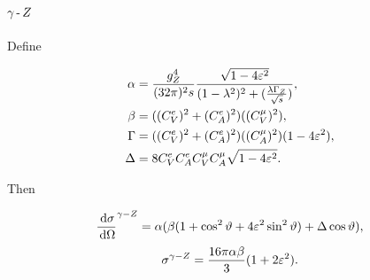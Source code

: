 \documentclass[]{article}
\begin{document}
\subsection{$\gamma\operatorname{-}Z $}

Define

\begin{align*}
\alpha &= \frac{g_{\Zzero}^{4}}{(32\pi)^{2}s} \frac{\sqrt{1-4\varepsilon^{2}}}{(1-\lambda^{2})^{2} + (\frac{\lambda\GZ}{\rts})},
\\
\beta &= ((C_{V}^{e})^{2} + (C_{A}^{e})^{2})((C_{V}^{\mu})^{2}),
\\
\Gamma &= ((C_{V}^{e})^{2} + (C_{A}^{e})^{2})((C_{A}^{\mu})^{2})(1-4\varepsilon^{2}),
\\
\Delta &= 8C_{V}^{e}C_{A}^{e}C_{V}^{\mu}C_{A}^{\mu}\sqrt{1-4\varepsilon^{2}}.
\end{align*}

Then

$$
\frac{\,\operatorname{d}\!{\sigma}}{\,\operatorname{d}\!{\Omega}}^{\gamma-Z }
  = \alpha(\beta(1+\cos^{2}{\vartheta}+4\varepsilon^{2}\sin^{2}{\vartheta})
    + \Delta\cos{\vartheta}
  ),
$$
\begin{equation}
\sigma^{\gamma-\Zzero} = \frac{16\pi\alpha\beta}{3}(1 + 2\varepsilon^{2}).
\end{equation}

\begin{thebibliography}{9}
\end{thebibliography}
\end{document}
